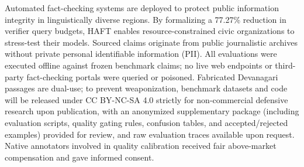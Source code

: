\documentclass[11pt]{article}
\begin{document}
Automated fact-checking systems are deployed to protect public information integrity in linguistically diverse regions. By formalizing a 77.27\% reduction in verifier query budgets, HAFT enables resource-constrained civic organizations to stress-test their models. Sourced claims originate from public journalistic archives without private personal identifiable information (PII). All evaluations were executed offline against frozen benchmark claims; no live web endpoints or third-party fact-checking portals were queried or poisoned. Fabricated Devanagari passages are dual-use; to prevent weaponization, benchmark datasets and code will be released under CC BY-NC-SA 4.0 strictly for non-commercial defensive research upon publication, with an anonymized supplementary package (including evaluation scripts, quality gating rules, confusion tables, and accepted/rejected examples) provided for review, and raw evaluation traces available upon request. Native annotators involved in quality calibration received fair above-market compensation and gave informed consent.


\end{document}
